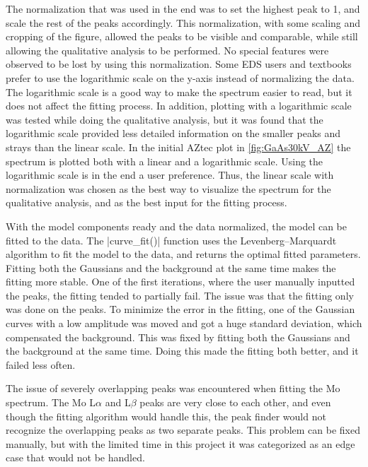 The normalization that was used in the end was to set the highest peak to 1, and scale the rest of the peaks accordingly.
This normalization, with some scaling and cropping of the figure, allowed the peaks to be visible and comparable, while still allowing the qualitative analysis to be performed.
No special features were observed to be lost by using this normalization.
Some EDS users and textbooks prefer to use the logarithmic scale on the y-axis instead of normalizing the data.
The logarithmic scale is a good way to make the spectrum easier to read, but it does not affect the fitting process.
In addition, plotting with a logarithmic scale was tested while doing the qualitative analysis, but it was found that the logarithmic scale provided less detailed information on the smaller peaks and strays than the linear scale.
In the initial AZtec plot in \cref{fig:GaAs30kV_AZ} the spectrum is plotted both with a linear and a logarithmic scale.
Using the logarithmic scale is in the end a user preference.
Thus, the linear scale with normalization was chosen as the best way to visualize the spectrum for the qualitative analysis, and as the best input for the fitting process.


With the model components ready and the data normalized, the model can be fitted to the data.
The \cverb|curve_fit()| function uses the Levenberg–Marquardt algorithm to fit the model to the data, and returns the optimal fitted parameters.
Fitting both the Gaussians and the background at the same time makes the fitting more stable.
One of the first iterations, where the user manually inputted the peaks, the fitting tended to partially fail.
The issue was that the fitting only was done on the peaks.
To minimize the error in the fitting, one of the Gaussian curves with a low amplitude was moved and got a huge standard deviation, which compensated the background.
This was fixed by fitting both the Gaussians and the background at the same time.
Doing this made the fitting both better, and it failed less often.

The issue of severely overlapping peaks was encountered when fitting the Mo spectrum.
The Mo L$\alpha$ and L$\beta$ peaks are very close to each other, and even though the fitting algorithm would handle this, the peak finder would not recognize the overlapping peaks as two separate peaks.
This problem can be fixed manually, but with the limited time in this project it was categorized as an edge case that would not be handled.




